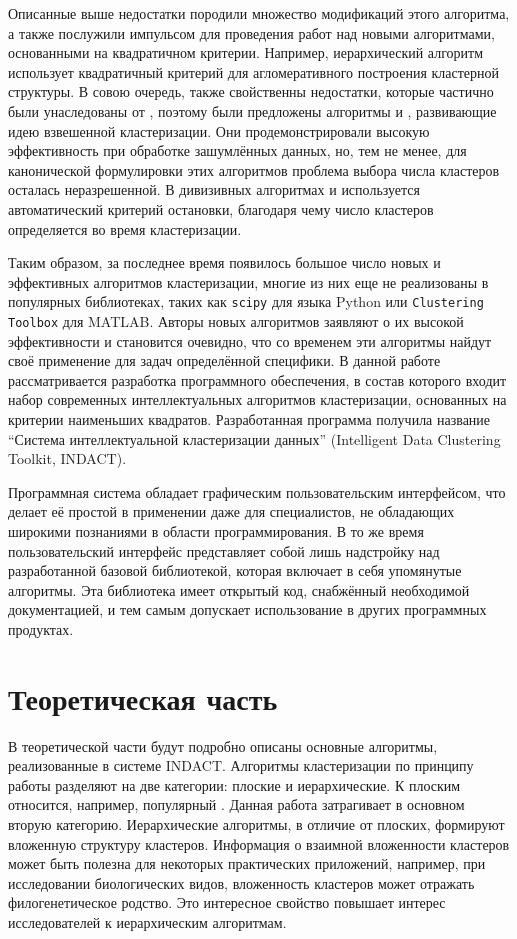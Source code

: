 \documentclass[12pt]{diploma}
\begin{document}
		Описанные выше недостатки \kmeans породили множество модификаций этого алгоритма, а также послужили импульсом для проведения работ над новыми алгоритмами, основанными на квадратичном критерии. Например, иерархический алгоритм \Ward \cite{ward-canonical} использует квадратичный критерий для агломеративного построения кластерной структуры. В совою очередь, \Ward также свойственны недостатки, которые частично были унаследованы от \kmeans, поэтому были предложены алгоритмы \Wardp и \AWardpb \cite{amorim-makarenkov-mirkin}, развивающие идею взвешенной кластеризации. Они продемонстрировали высокую эффективность при обработке зашумлённых данных, но, тем не менее, для канонической формулировки этих алгоритмов проблема выбора числа кластеров осталась неразрешенной. В дивизивных алгоритмах \BiKMR и \dePDDP \cite{kovaleva} используется автоматический критерий остановки, благодаря чему число кластеров определяется во время кластеризации.
		
		Таким образом, за последнее время появилось большое число новых и эффективных алгоритмов кластеризации, многие из них еще не реализованы в популярных библиотеках, таких как \texttt{scipy} для языка Python или  \texttt{Clustering Toolbox} для MATLAB. Авторы новых алгоритмов заявляют о их высокой эффективности и становится очевидно, что со временем эти алгоритмы найдут своё применение для задач определённой специфики. В данной работе рассматривается разработка программного обеспечения, в состав которого входит набор современных интеллектуальных алгоритмов кластеризации, основанных на критерии наименьших квадратов. Разработанная программа получила название ``Система интеллектуальной кластеризации данных'' (Intelligent Data Clustering Toolkit, INDACT).
		
		Программная система обладает графическим пользовательским интерфейсом, что делает её простой в применении даже для специалистов, не обладающих широкими познаниями в области программирования. В то же время пользовательский интерфейс представляет собой лишь надстройку над разработанной базовой библиотекой, которая включает в себя упомянутые алгоритмы. Эта библиотека имеет открытый код, снабжённый необходимой документацией, и тем самым допускает использование в других программных продуктах. 
		
	\section{Теоретическая часть}
	
	В теоретической части будут подробно описаны основные алгоритмы, реализованные в системе INDACT. Алгоритмы кластеризации по принципу работы разделяют на две категории: плоские и иерархические. К плоским относится, например, популярный \kmeans. Данная работа затрагивает в основном вторую категорию. Иерархические алгоритмы, в отличие от плоских, формируют вложенную структуру кластеров. Информация о взаимной вложенности кластеров может быть полезна для некоторых практических приложений, например, при исследовании биологических видов, вложенность кластеров может отражать филогенетическое родство. Это интересное свойство повышает интерес исследователей к иерархическим алгоритмам.
	
\end{document}
